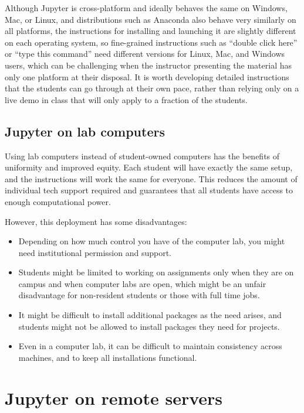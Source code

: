 \documentclass[]{book}
\begin{document}
Although Jupyter is cross-platform and ideally behaves the same on
Windows, Mac, or Linux, and distributions such as Anaconda also behave
very similarly on all platforms, the instructions for installing and
launching it are slightly different on each operating system, so
fine-grained instructions such as ``double click here'' or ``type this
command'' need different versions for Linux, Mac, and Windows users,
which can be challenging when the instructor presenting the material has
only one platform at their disposal. It is worth developing detailed
instructions that the students can go through at their own pace, rather
than relying only on a live demo in class that will only apply to a
fraction of the students.

\subsection{Jupyter on lab computers}\label{jupyter-on-lab-computers}

Using lab computers instead of student-owned computers has the benefits
of uniformity and improved equity. Each student will have exactly the
same setup, and the instructions will work the same for everyone. This
reduces the amount of individual tech support required and guarantees
that all students have access to enough computational power.

However, this deployment has some disadvantages:

\begin{itemize}
\item
  Depending on how much control you have of the computer lab, you might
  need institutional permission and support.
\item
  Students might be limited to working on assignments only when they are
  on campus and when computer labs are open, which might be an unfair
  disadvantage for non-resident students or those with full time jobs.
\item
  It might be difficult to install additional packages as the need
  arises, and students might not be allowed to install packages they
  need for projects.
\item
  Even in a computer lab, it can be difficult to maintain consistency
  across machines, and to keep all installations functional.
\end{itemize}

\section{Jupyter on remote servers}\label{jupyter-on-remote-servers}
\end{document}
